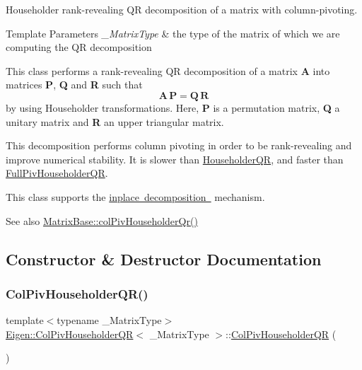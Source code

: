 Householder rank-\/revealing QR decomposition of a matrix with column-\/pivoting. 


\begin{DoxyTemplParams}{Template Parameters}
{\em \+\_\+\+Matrix\+Type} & the type of the matrix of which we are computing the QR decomposition\\
\hline
\end{DoxyTemplParams}
This class performs a rank-\/revealing QR decomposition of a matrix {\bfseries{A}} into matrices {\bfseries{P}}, {\bfseries{Q}} and {\bfseries{R}} such that \[ \mathbf{A} \, \mathbf{P} = \mathbf{Q} \, \mathbf{R} \] by using Householder transformations. Here, {\bfseries{P}} is a permutation matrix, {\bfseries{Q}} a unitary matrix and {\bfseries{R}} an upper triangular matrix.

This decomposition performs column pivoting in order to be rank-\/revealing and improve numerical stability. It is slower than \mbox{\hyperlink{class_eigen_1_1_householder_q_r}{Householder\+QR}}, and faster than \mbox{\hyperlink{class_eigen_1_1_full_piv_householder_q_r}{Full\+Piv\+Householder\+QR}}.

This class supports the \mbox{\hyperlink{}{inplace decomposition }} mechanism.

\begin{DoxySeeAlso}{See also}
\mbox{\hyperlink{class_eigen_1_1_matrix_base_adee8c19c833245bbb00a591dce68e8a4}{Matrix\+Base\+::col\+Piv\+Householder\+Qr()}} 
\end{DoxySeeAlso}


\subsection{Constructor \& Destructor Documentation}
\mbox{\label{class_eigen_1_1_col_piv_householder_q_r_a9d8a92c2a2f0debe5454812372237ed4}} 
\subsubsection{\texorpdfstring{ColPivHouseholderQR()}{ColPivHouseholderQR()}\hspace{0.1cm}{\footnotesize\ttfamily [1/4]}}
{\footnotesize\ttfamily template$<$typename \+\_\+\+Matrix\+Type$>$ \\
\mbox{\hyperlink{class_eigen_1_1_col_piv_householder_q_r}{Eigen\+::\+Col\+Piv\+Householder\+QR}}$<$ \+\_\+\+Matrix\+Type $>$\+::\mbox{\hyperlink{class_eigen_1_1_col_piv_householder_q_r}{Col\+Piv\+Householder\+QR}} (\begin{DoxyParamCaption}{ }\end{DoxyParamCaption})\hspace{0.3cm}{\ttfamily [inline]}}



